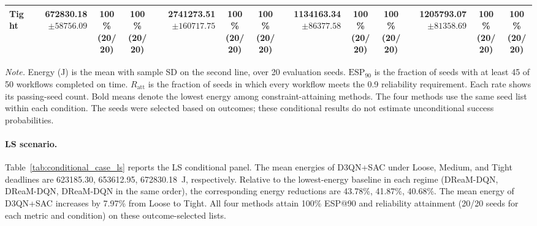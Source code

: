 \documentclass[10pt]{article}
\begin{document}
\begin{table}[!htbp]
\begin{tabular}{@{}l*{4}{rcc}@{}}
Tight & \shortstack[r]{\textbf{672830.18}\\$\pm 58756.09$} & \shortstack[c]{100\%\\(20/20)} & \shortstack[c]{100\%\\(20/20)} & \shortstack[r]{2741273.51\\$\pm 160717.75$} & \shortstack[c]{100\%\\(20/20)} & \shortstack[c]{100\%\\(20/20)} & \shortstack[r]{1134163.34\\$\pm 86377.58$} & \shortstack[c]{100\%\\(20/20)} & \shortstack[c]{100\%\\(20/20)} & \shortstack[r]{1205793.07\\$\pm 81358.69$} & \shortstack[c]{100\%\\(20/20)} & \shortstack[c]{100\%\\(20/20)} \\
\bottomrule
\end{tabular}
\par\vspace{3pt}
\parbox{\textwidth}{\footnotesize
\textit{Note.} Energy (J) is the mean with sample SD on the second line, over 20 evaluation seeds.
$\mathrm{ESP}_{90}$ is the fraction of seeds with at least 45 of 50 workflows completed on time.
$R_{\mathrm{att}}$ is the fraction of seeds in which every workflow meets the 0.9 reliability requirement.
Each rate shows its passing-seed count. Bold means denote the lowest energy among constraint-attaining methods.
The four methods use the same seed list within each condition.
The seeds were selected based on outcomes; these conditional results do not estimate unconditional success probabilities.}
\endgroup
\end{table}

\paragraph{LS scenario.}
Table~\ref{tab:conditional_case_ls} reports the LS conditional panel. The mean energies of D3QN+SAC under Loose, Medium, and Tight deadlines are 623185.30, 653612.95, 672830.18~J, respectively. Relative to the lowest-energy baseline in each regime (DReaM-DQN, DReaM-DQN, DReaM-DQN in the same order), the corresponding energy reductions are 43.78\%, 41.87\%, 40.68\%. The mean energy of D3QN+SAC increases by 7.97\% from Loose to Tight. All four methods attain 100\% ESP@90 and reliability attainment (20/20 seeds for each metric and condition) on these outcome-selected lists.
\end{document}
